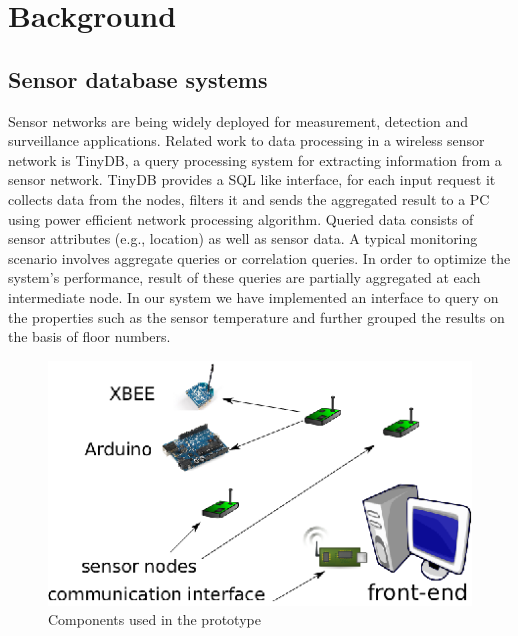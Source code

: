 \section{Background}\label{sec:background}

\subsection{Sensor database systems}
Sensor networks are being widely deployed for measurement, detection and surveillance applications.  Related work to data processing in a wireless sensor network is TinyDB, a query processing system for extracting information from a sensor network. TinyDB provides a SQL like interface, for each input request it collects data from the nodes, filters it and sends the aggregated result to a PC using power efficient network processing algorithm. Queried data consists of sensor attributes (e.g., location) as well as sensor data. A typical monitoring scenario involves aggregate queries or correlation queries. In order to optimize the system's  performance, result of these queries are partially aggregated at each intermediate node. In our system we have implemented an interface to query on the properties such as the sensor temperature and further grouped the results on the basis of floor numbers.

\begin{figure}[t]
\centering
\includegraphics[scale=1.2]{figures/topology.eps}
\caption{Components used in the prototype}
\label{fig:topology}
\end{figure}

